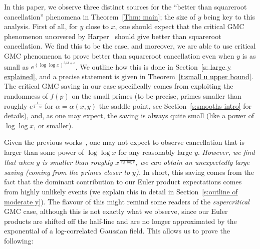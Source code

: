 \documentclass[12pt,a4paper,reqno]{amsart}
\numberwithin{equation}{section}
\theoremstyle{remark}
\theoremstyle{definition}
\numberwithin{equation}{section}
\theoremstyle{remark}
\begin{document}
\bigskip 
In this paper, we observe three distinct sources for the ``better than squareroot cancellation'' phenomena in Theorem~\ref{Thm: main}; the size of $y$ being key to this analysis. First of all, for $y$ close to $x$, one should expect that the critical GMC phenomenon uncovered by Harper~\cite{HarperLow} should give better than squareroot cancellation. We find this to be the case, and moreover, we are able to use critical GMC phenomenon to prove better than squareroot cancellation even when $y$ is as small as $e^{(\log \log x)^{5/3+\varepsilon}}$. We outline how this is done in Section~\ref{s: large y explained}, and a precise statement is given in Theorem~\ref{t:small u upper bound}. The critical GMC saving in our case specifically comes from exploiting the randomness of $f(p)$ on the small primes (to be precise, primes smaller than roughly $e^{\frac{1}{1 - \alpha}}$ for $\alpha = \alpha(x,y)$ the saddle point, see Section~\ref{s:smooths intro} for details), and, as one may expect, the saving is always quite small (like a power of $\log \log x$, or smaller).

Given the previous works~\cite{Caichshort, HarperLow, Xu}, one may not expect to observe cancellation that is larger than some power of $\log \log x$ for any reasonably large $y$. \emph{However, we find that when $y$ is smaller than roughly $x^{\frac{1}{\log \log x}}$, we can obtain an unexpectedly large saving (coming from the primes closer to $y$).} In short, this saving comes from the fact that the dominant contribution to our Euler product expectations comes from highly unlikely events (we explain this in detail in Section~\ref{s:outline of moderate y}). The flavour of this might remind some readers of the \textit{supercritical} GMC case, although this is not exactly what we observe, since our Euler products are shifted off the half-line and are no longer approximated by the exponential of a log-correlated Gaussian field. This allows us to prove the following:
\end{document}
